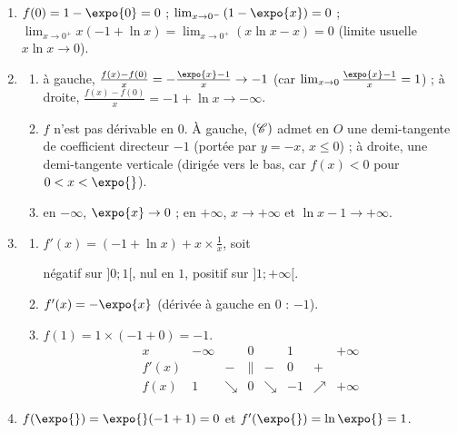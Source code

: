 	\begin{enumerate}
		\item {}
			$f(0) = 1 - \expo{0} = 0$ ; $\lim_{x\to0^-}\left(1 - \expo{x}\right) = 0$ ;
			$\lim_{x\to0^+} x(-1 + \ln x) = \lim_{x\to0^+}\left(x\ln x - x\right) = 0$ (limite usuelle $x\ln x \to 0$).

		\item \begin{enumerate}
			\item {}
				à gauche, $\frac{f(x) - f(0)}{x} = -\frac{\expo{x} - 1}{x} \to -1$ (car $\lim_{x\to0}\frac{\expo{x}-1}{x} = 1$) ;
				à droite, $\frac{f(x) - f(0)}{x} = -1 + \ln x \to -\infty$.

			\item {}
				$f$ n'est pas dérivable en $0$. À gauche, $(\mathscr{C})$ admet en $O$ une demi-tangente de coefficient directeur $-1$
				(portée par $y = -x$, $x \leq 0$) ; à droite, une demi-tangente verticale (dirigée vers le bas, car $f(x) < 0$ pour $0 < x < \expo{}$).
			\item {}
				en $-\infty$, $\expo{x} \to 0$ ; en $+\infty$, $x \to +\infty$ et $\ln x - 1 \to +\infty$.

		\end{enumerate}
		\item \begin{enumerate}
			\item {} $f'(x) = (-1 + \ln x) + x\times\frac{1}{x}$, soit


				négatif sur $]0;1[$, nul en $1$, positif sur $]1;+\infty[$.
			\item {} $f'(x) = -\expo{x}$ (dérivée à gauche en $0$ : $-1$).

			\item {} $f(1) = 1\times(-1 + 0) = -1$.
				\[
				\begin{array}{c|ccccccc}
					x & -\infty & & 0 & & 1 & & +\infty \\ \hline
					f'(x) & & - & \| & - & 0 & + & \\ \hline
					f(x) & 1 & \searrow & 0 & \searrow & -1 & \nearrow & +\infty
				\end{array}
				\]
		\end{enumerate}
		\item {} $f(\expo{}) = \expo{}(-1 + 1) = 0$ et $f'(\expo{}) = \ln\expo{} = 1$.


\end{enumerate}
